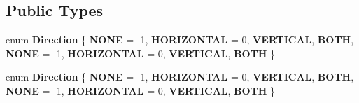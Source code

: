 \subsection*{Public Types}
\begin{DoxyCompactItemize}
\item 
\mbox{\label{classScrollView_af6f9fe2ea575021cc020df1f0564a7a2}} 
enum {\bfseries Direction} \{ \newline
{\bfseries N\+O\+NE} = -\/1, 
{\bfseries H\+O\+R\+I\+Z\+O\+N\+T\+AL} = 0, 
{\bfseries V\+E\+R\+T\+I\+C\+AL}, 
{\bfseries B\+O\+TH}, 
\newline
{\bfseries N\+O\+NE} = -\/1, 
{\bfseries H\+O\+R\+I\+Z\+O\+N\+T\+AL} = 0, 
{\bfseries V\+E\+R\+T\+I\+C\+AL}, 
{\bfseries B\+O\+TH}
 \}
\item 
\mbox{\label{classScrollView_af6f9fe2ea575021cc020df1f0564a7a2}} 
enum {\bfseries Direction} \{ \newline
{\bfseries N\+O\+NE} = -\/1, 
{\bfseries H\+O\+R\+I\+Z\+O\+N\+T\+AL} = 0, 
{\bfseries V\+E\+R\+T\+I\+C\+AL}, 
{\bfseries B\+O\+TH}, 
\newline
{\bfseries N\+O\+NE} = -\/1, 
{\bfseries H\+O\+R\+I\+Z\+O\+N\+T\+AL} = 0, 
{\bfseries V\+E\+R\+T\+I\+C\+AL}, 
{\bfseries B\+O\+TH}
 \}
\end{DoxyCompactItemize}
